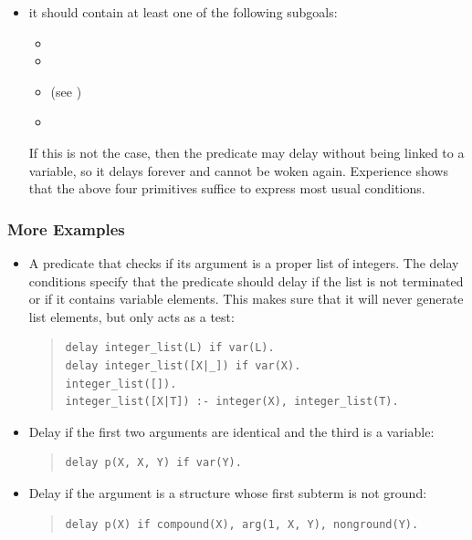 {\begin{itemize}
\item it should contain at least one of the following subgoals:
\begin{itemize}
\item {}
\item {}
\item {} (see
  )
\item {}
\end{itemize}
If this is not the case, then the predicate may delay without being linked
to a variable, so it delays forever and cannot be woken again.
Experience shows that the above four primitives suffice to express most
usual conditions.
\end{itemize}

\subsubsection{More Examples}
\begin{itemize}
\item
A predicate that checks if its argument is a proper list of integers.
The delay conditions specify that the predicate should delay if the list
is not terminated or if it contains variable elements.
This makes sure that it will never generate list elements, but only
acts as a test:
\begin{quote}
\begin{verbatim}
delay integer_list(L) if var(L).
delay integer_list([X|_]) if var(X).
integer_list([]).
integer_list([X|T]) :- integer(X), integer_list(T).
\end{verbatim}
\end{quote}

\item
Delay if the first two arguments are identical and the third is a variable:
\begin{quote}
\begin{verbatim}
delay p(X, X, Y) if var(Y).
\end{verbatim}
\end{quote}

\item
Delay if the argument is a structure whose first subterm is not ground:
\begin{quote}
\begin{verbatim}
delay p(X) if compound(X), arg(1, X, Y), nonground(Y).
\end{verbatim}
\end{quote}


\end{itemize}}
